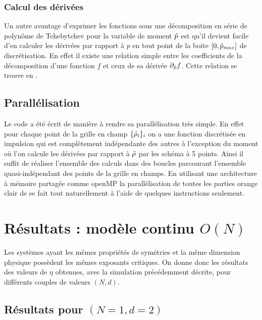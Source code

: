 \documentclass[10.5pt]{article}
\begin{document}
\begin{multicols*}{2}
\subsubsection{Calcul des dérivées}

Un autre avantage d'exprimer les fonctions sous une décomposition en série de polynôme de Tchebytchev pour la variable de moment $\tilde{p}$ est qu'il devient facile d'en calculer les dérivées par rapport à $p$ en tout point de la boite $[0, \tilde{p}_{max}]$ de discrétisation. En effet il existe une relation simple entre les coefficients de la décomposition d'une fonction $f$ et ceux de sa dérivée $\partial_{\tilde{p}} f$. Cette relation se trouve en . \\








\subsection{Parallélisation}


Le code a été écrit de manière à rendre sa parallélisation très simple. En effet pour chaque point de la grille en champ $\{\tilde{\rho}_i\}_i$ on a une fonction discrétisée en impulsion qui est complètement indépendante des autres à l'exception du moment où l'on calcule les dérivées par rapport à $\tilde{\rho}$ par les schéma à 5 points. Ainsi il suffit de réaliser l'ensemble des calculs dans des boucles parcourant l'ensemble quasi-indépendant des points de la grille en champs. En utilisant une architecture à mémoire partagée comme openMP \cite{openmp2002c++} la parallélisation de toutes les parties orange clair de  se fait tout naturellement à l'aide de quelques instructions seulement. 



\section{Résultats : modèle continu $O(N)$}

\label{sec:ResContinu}

Les systèmes ayant les mêmes propriétés de symétries et la même dimension physique possèdent les mêmes exposants critiques. On donne donc les résultats des valeurs de $\eta$ obtenues, avec la simulation précédemment décrite, pour différents couples de valeurs $(N,d)$.


\subsection{Résultats pour $(N = 1, d=2)$}


\end{multicols*}
\end{document}
